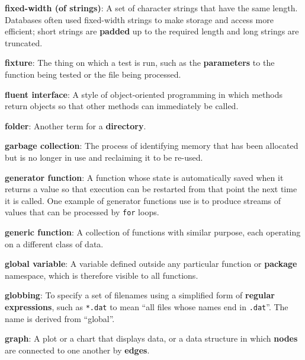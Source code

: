 \documentclass[krantzl]{krantz}
\newcommand{\glosskey}[1]{\textbf{#1}}
\begin{document}
\noindent \textbf{{\newline}\glosskey{fixed-width (of strings)}}: 
A set of character strings that have the same length. Databases often used fixed-width strings to make storage and access more efficient; short strings are \glosskey{padded} up to the required length and long strings are truncated.


\noindent \textbf{{\newline}\glosskey{fixture}}: 
The thing on which a test is run, such as the \glosskey{parameters} to the function being tested or the file being processed.


\noindent \textbf{{\newline}\glosskey{fluent interface}}: 
A style of object-oriented programming in which methods return objects so that other methods can immediately be called.


\noindent \textbf{{\newline}\glosskey{folder}}: 
Another term for a \glosskey{directory}.


\noindent \textbf{{\newline}\glosskey{garbage collection}}: 
The process of identifying memory that has been allocated but is no longer in use and reclaiming it to be re-used.


\noindent \textbf{{\newline}\glosskey{generator function}}: 
A function whose state is automatically saved when it returns a value so that execution can be restarted from that point the next time it is called. One example of generator functions use is to produce streams of values that can be processed by \texttt{for} loops.


\noindent \textbf{{\newline}\glosskey{generic function}}: 
A collection of functions with similar purpose, each operating on a different class of data.


\noindent \textbf{{\newline}\glosskey{global variable}}: 
A variable defined outside any particular function or \glosskey{package} namespace, which is therefore visible to all functions.


\noindent \textbf{{\newline}\glosskey{globbing}}: 
To specify a set of filenames using a simplified form of \glosskey{regular expressions}, such as \texttt{*.dat} to mean “all files whose names end in \texttt{.dat}”. The name is derived from “global”.


\noindent \textbf{{\newline}\glosskey{graph}}: 
A plot or a chart that displays data, or a data structure in which \glosskey{nodes} are connected to one another by \glosskey{edges}.
\end{document}

